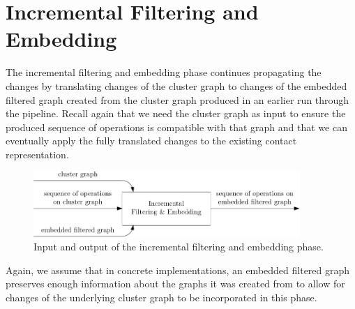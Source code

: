 \section{Incremental Filtering and Embedding}
\label{sect:incremental-filtering-and-embedding}

The incremental filtering and embedding phase continues propagating the changes by translating changes of the cluster graph to changes of the embedded filtered graph created from the cluster graph produced in an earlier run through the pipeline. Recall again that we need the cluster graph as input to ensure the produced sequence of operations is compatible with that graph and that we can eventually apply the fully translated changes to the existing contact representation.

\begin{figure}[H]
	\centering\includegraphics[width=0.9\textwidth]{Resources/DynamicPipeline-IncrementalFilteringAndEmbedding.pdf}
	\caption{Input and output of the incremental filtering and embedding phase.}
	\label{fig:dynamic-pipeline-incremental-filtering-and-embedding}
\end{figure}

Again, we assume that in concrete implementations, an embedded filtered graph preserves enough information about the graphs it was created from to allow for changes of the underlying cluster graph to be incorporated in this phase.

